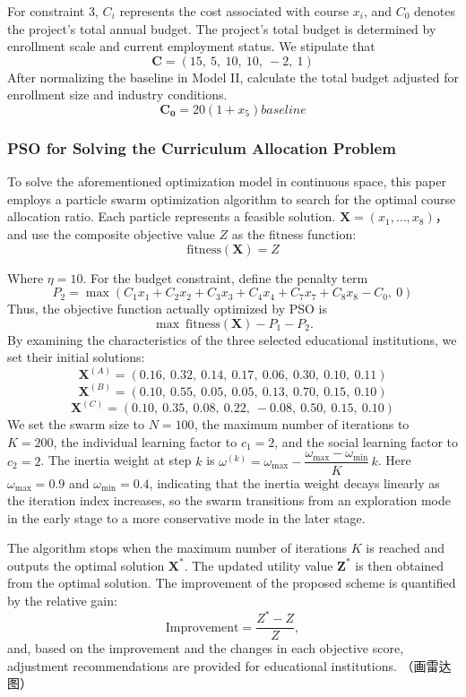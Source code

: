 \documentclass{mcmthesis}
\begin{document}
For constraint 3, $C_i$ represents the cost associated with course $x_i$, and $C_0$ denotes the project's total annual budget. The project's total budget is determined by enrollment scale and current employment status. We stipulate that
\[
\mathbf{C}=
(15,\ 5,\ 10,\ 10,\ -2,\ 1)
\]
After normalizing the baseline in Model II, calculate the total budget adjusted for enrollment size and industry conditions.
\[
\mathbf{C_0}=
20(1+x_5)baseline
\]

\subsubsection{PSO for Solving the Curriculum Allocation Problem}
To solve the aforementioned optimization model in continuous space, this paper employs a particle swarm optimization algorithm to search for the optimal course allocation ratio. Each particle represents a feasible solution.
$\mathbf{X}=(x_1,\dots,x_8)$，
and use the composite objective value $Z$ as the fitness function:
\[
\mathrm{fitness}(\mathbf{X})=Z
\]

Where $\eta=10$. For the budget constraint, define the penalty term
\[
P_2=\max\!\left(C_1x_1+C_2x_2+C_3x_3+C_4x_4+C_7x_7+C_8x_8-C_0,\ 0\right)
\]
Thus, the objective function actually optimized by PSO is
\[
\max \ \mathrm{fitness}(\mathbf{X})-P_1-P_2.
\]
By examining the characteristics of the three selected educational institutions, we set their initial solutions:
\[
\mathbf{X}^{(A)}=
(0.16,\ 0.32,\ 0.14,\ 0.17,\ 0.06,\ 0.30,\ 0.10,\ 0.11)
\]
\[
\mathbf{X}^{(B)}=
(0.10,\ 0.55,\ 0.05,\ 0.05,\ 0.13,\ 0.70,\ 0.15,\ 0.10)
\]
\[
\mathbf{X}^{(C)}=
(0.10,\ 0.35,\ 0.08,\ 0.22,\ -0.08,\ 0.50,\ 0.15,\ 0.10)
\]
We set the swarm size to \(N=100\), the maximum number of iterations to \(K=200\), the individual learning factor to \(c_1=2\), and the social learning factor to \(c_2=2\). The inertia weight at step \(k\) is \(\omega^{(k)}=\omega_{\max}-\dfrac{\omega_{\max}-\omega_{\min}}{K}\,k\). Here \(\omega_{\max}=0.9\) and \(\omega_{\min}=0.4\), indicating that the inertia weight decays linearly as the iteration index increases, so the swarm transitions from an exploration mode in the early stage to a more conservative mode in the later stage.

The algorithm stops when the maximum number of iterations \(K\) is reached and outputs the optimal solution \(\mathbf{X}^\ast\). The updated utility value \(\mathbf{Z}^\ast\) is then obtained from the optimal solution. The improvement of the proposed scheme is quantified by the relative gain:
\[
\mathrm{Improvement}=\frac{Z^\ast-Z}{Z},
\]
and, based on the improvement and the changes in each objective score, adjustment recommendations are provided for educational institutions. 
（画雷达图）
\end{document}
